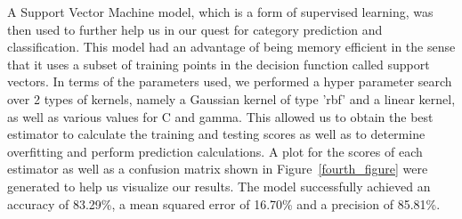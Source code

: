 \documentclass[10pt,twocolumn,letterpaper]{article}
\begin{document}
A Support Vector Machine model, which is a form of supervised learning, was then used to further help us in our quest for category prediction and classification. This model had an advantage of being memory efficient in the sense that it uses a subset of training points in the decision function called support vectors. In terms of the parameters used, we performed a hyper parameter search over 2 types of kernels, namely a Gaussian kernel of type 'rbf' and a linear kernel, as well as various values for C and gamma. This allowed us to obtain the best estimator to calculate the training and testing scores as well as to determine overfitting and perform prediction calculations. A plot for the scores of each estimator as well as a confusion matrix shown in Figure~\ref{fourth_figure} were generated to help us visualize our results. The model successfully achieved an accuracy of 83.29\%, a mean squared error of 16.70\% and a precision of 85.81\%.
\end{document}
